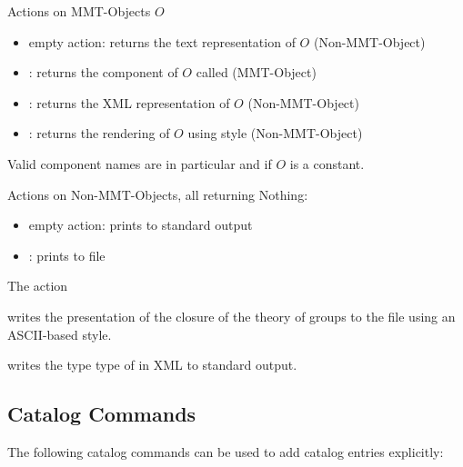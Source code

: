 \noindent
Actions on MMT-Objects $O$
\begin{itemize}
\item empty action: returns the text representation of $O$ (Non-MMT-Object)
\item {}: returns the component of $O$ called  (MMT-Object)
\item {}: returns the XML representation of $O$ (Non-MMT-Object)
\item {}: returns the rendering of $O$ using style  (Non-MMT-Object)
\end{itemize}
Valid component names  are in particular  and  if $O$ is a constant.


\noindent
Actions on Non-MMT-Objects, all returning Nothing:
\begin{itemize}
\item empty action: prints to standard output
\item {}: prints to file 
\end{itemize}

\begin{example}
The action

\noindent
{}
writes the presentation of the closure of the theory of groups to the file  using an ASCII-based style.

\noindent
{}
writes the type type of  in XML to standard output.
\end{example}

\subsection{Catalog Commands}\label{sec:shell:catalog}
The following catalog commands can be used to add catalog entries explicitly:

